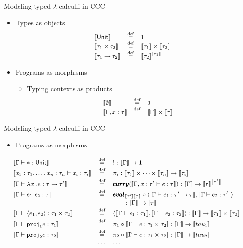 \documentclass[paper=screen,mode=present,style=zysimple]{powerdot}
\begin{document}
\begin{slide}{Modeling typed $\lambda$-calculli in CCC}
\begin{itemize}
\item Types as objects 
$$\small
\begin{array}{lcl}
\Eval{\tunit} & \defeq & 1 \\
\Eval{\tau_1 \times \tau_2} & \defeq & \Eval{\tau_1} \times \Eval{\tau_2} \\
\Eval{\tau_1 \to \tau_2} & \defeq & \Eval{\tau_2}^{\Eval{\tau_1}}
\end{array}
$$\vspace*{-0.5em}
\item Programs as morphisms
\begin{itemize}\small
\item Typing contexts as products
$$\small
\begin{array}{lcl}
\Eval{\emptyset} & \defeq & 1 \\
\Eval{\Gamma, x : \tau} & \defeq & \Eval\Gamma \times \Eval{\tau}
\end{array}
$$
\end{itemize}
\end{itemize}
\end{slide}

\begin{slide}{Modeling typed $\lambda$-calculli in CCC}
\begin{itemize}
\item Programs as morphisms
\end{itemize}
$$\small
\begin{array}{lcl}
\Eval{\Gamma \vdash * : \tunit} & \defeq & ! : \Eval{\Gamma} \to 1 
\\[0.2em]
\Eval{x_1 : \tau_1, \ldots, x_n : \tau_n \vdash x_i : \tau_i} & \defeq & 
\pi_i : \Eval{\tau_1} \times \cdots \times \Eval{\tau_n} \to \Eval{\tau_i}
\\[0.2em]
\Eval{\Gamma \vdash \lambda x \ldot e : \tau \to \tau'} & \defeq & 
\pmb{curry}(\Eval{\Gamma, x : \tau' \vdash e : \tau}) : \Eval{\Gamma} \to \Eval{\tau}^{\Eval{\tau'}}
\\[0.2em]
\Eval{\Gamma \vdash e_1 \ e_2 : \tau} & \defeq & 
\pmb{eval}_{\Eval{\tau'} \Eval{\tau}} \circ \cpair{\Eval{\Gamma \vdash e_1 : \tau' \to \tau}, \Eval{\Gamma \vdash e_2 : \tau'}}
\\[0.1em]
& & \qquad : \Eval{\Gamma} \to \Eval{\tau} 
\\[0.2em]
\Eval{\Gamma \vdash \cpair{e_1, e_2} : \tau_1 \times \tau_2} & \defeq &
\cpair{\Eval{\Gamma \vdash e_1 : \tau_1}, \Eval{\Gamma \vdash e_2 : \tau_2}} 
: \Eval{\Gamma} \to \Eval{\tau_1} \times \Eval{\tau_2}
\\[0.2em]
\Eval{\Gamma \vdash \cproj_1{e} : \tau_1} & \defeq &
\pi_1 \circ \Eval{\Gamma \vdash e : \tau_1 \times \tau_2} : \Eval{\Gamma} \to \Eval{tau_1}
\\[0.2em]
\Eval{\Gamma \vdash \cproj_2{e} : \tau_2} & \defeq &
\pi_2 \circ \Eval{\Gamma \vdash e : \tau_1 \times \tau_2} : \Eval{\Gamma} \to \Eval{tau_2}
\\[0.2em]
 & \cdots & \cdots
\end{array}
$$
\end{slide}
\end{document}
